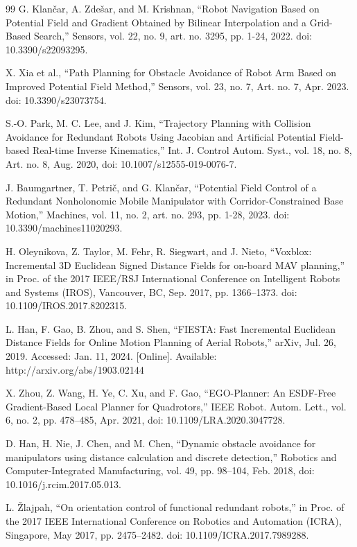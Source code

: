\documentclass[letterpaper, 10 pt, conference]{ieeeconf}  %
\begin{document}
\begin{thebibliography}{99}
G. Klančar, A. Zdešar, and M. Krishnan, “Robot Navigation Based on Potential Field and Gradient Obtained by Bilinear Interpolation and a Grid-Based Search,” Sensors, vol. 22, no. 9, art. no. 3295, pp. 1-24, 2022. doi: 10.3390/s22093295.

 X. Xia et al., “Path Planning for Obstacle Avoidance of Robot Arm Based on Improved Potential Field Method,” Sensors, vol. 23, no. 7, Art. no. 7, Apr. 2023. doi: 10.3390/s23073754.

 S.-O. Park, M. C. Lee, and J. Kim, “Trajectory Planning with Collision Avoidance for Redundant Robots Using Jacobian and Artificial Potential Field-based Real-time Inverse Kinematics,” Int. J. Control Autom. Syst., vol. 18, no. 8, Art. no. 8, Aug. 2020, doi: 10.1007/s12555-019-0076-7.

J. Baumgartner, T. Petrič, and G. Klančar, “Potential Field Control of a Redundant Nonholonomic Mobile Manipulator with Corridor-Constrained Base Motion,” Machines, vol. 11, no. 2, art. no. 293, pp. 1-28, 2023. doi: 10.3390/machines11020293.

 H. Oleynikova, Z. Taylor, M. Fehr, R. Siegwart, and J. Nieto, “Voxblox: Incremental 3D Euclidean Signed Distance Fields for on-board MAV planning,” in Proc. of the 2017 IEEE/RSJ International Conference on Intelligent Robots and Systems (IROS), Vancouver, BC, Sep. 2017, pp. 1366–1373. doi: 10.1109/IROS.2017.8202315.

 L. Han, F. Gao, B. Zhou, and S. Shen, “FIESTA: Fast Incremental Euclidean Distance Fields for Online Motion Planning of Aerial Robots,” arXiv, Jul. 26, 2019. Accessed: Jan. 11, 2024. [Online]. Available: http://arxiv.org/abs/1903.02144

 X. Zhou, Z. Wang, H. Ye, C. Xu, and F. Gao, “EGO-Planner: An ESDF-Free Gradient-Based Local Planner for Quadrotors,” IEEE Robot. Autom. Lett., vol. 6, no. 2, pp. 478–485, Apr. 2021, doi: 10.1109/LRA.2020.3047728.

 D. Han, H. Nie, J. Chen, and M. Chen, “Dynamic obstacle avoidance for manipulators using distance calculation and discrete detection,” Robotics and Computer-Integrated Manufacturing, vol. 49, pp. 98–104, Feb. 2018, doi: 10.1016/j.rcim.2017.05.013.

L. Žlajpah, “On orientation control of functional redundant robots,” in Proc. of the 2017 IEEE International Conference on Robotics and Automation (ICRA), Singapore, May 2017, pp. 2475–2482. doi: 10.1109/ICRA.2017.7989288.



\end{thebibliography}
\end{document}
